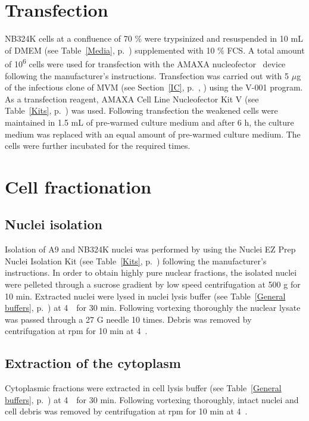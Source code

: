 \section{Transfection}
NB324K cells at a confluence of 70 \% were trypsinized and resuspended in 10 mL of DMEM (see Table~\ref{Media}, p.~\pageref{Media}) supplemented with 10 \% FCS. A total amount of 10\textsuperscript{6} cells were used for transfection with the AMAXA\textsuperscript{\texttrademark} nucleofector\textsuperscript{\texttrademark}~ device following the manufacturer’s instructions. Transfection was carried out with 5 $\mu$g of the infectious clone of MVM (see Section~\ref{IC}, p.~\pageref{IC}, \cite{pmid6345805}) using the V-001 program. As a transfection reagent, AMAXA\textsuperscript{\textregistered} Cell Line Nucleofector\textsuperscript{\textregistered} Kit V (see Table~\ref{Kits}, p.~\pageref{Kits}) was used. Following transfection the weakened cells were maintained in 1.5 mL of pre-warmed culture medium and after 6 h, the culture medium was replaced with an equal amount of pre-warmed culture medium. The cells were further incubated for the required times.
        

\section{Cell fractionation}
\label{Fractionation}
\subsection{Nuclei isolation}
Isolation of A9 and NB324K nuclei was performed by using the Nuclei EZ Prep Nuclei Isolation Kit (see Table~\ref{Kits}, p.~\pageref{Kits}) following the manufacturer’s instructions. In order to obtain highly pure nuclear fractions, the isolated nuclei were pelleted through a sucrose gradient by low speed centrifugation at 500 g for 10 min. Extracted nuclei were lysed in nuclei lysis buffer (see Table~\ref{General buffers}, p.~\pageref{General buffers}) at 4~\textcelsius~for 30 min. Following vortexing thoroughly the nuclear lysate was passed through a 27 G needle 10 times. Debris was removed by centrifugation at  rpm for 10 min at 4~\textcelsius.      

\subsection{Extraction of the cytoplasm}
Cytoplasmic fractions were extracted in cell lysis buffer (see Table~\ref{General buffers}, p.~\pageref{General buffers}) at 4~\textcelsius~for 30 min. Following vortexing thoroughly, intact nuclei and cell debris was removed by centrifugation at  rpm for 10 min at 4~\textcelsius. 




